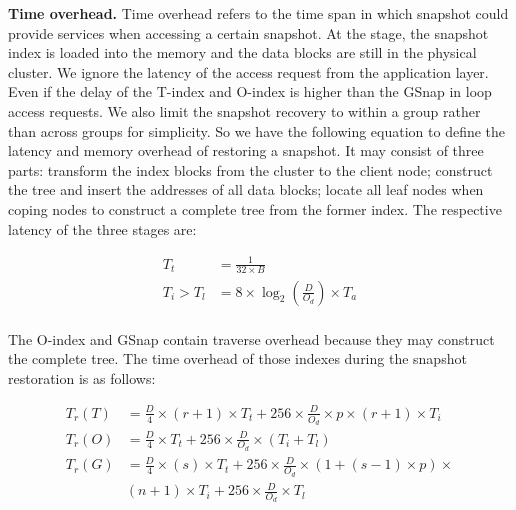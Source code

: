 \documentclass[sigconf, nonacm]{acmart}
\begin{document}
\textbf{Time overhead.} Time overhead refers to the time span in which snapshot could provide services when accessing a certain snapshot. At the stage, the snapshot index is loaded into the memory and the data blocks are still in the physical cluster. We ignore the latency of the access request from the application layer. Even if the delay of the T-index and O-index is higher than the GSnap in loop access requests. We also limit the snapshot recovery to within a group rather than across groups for simplicity. So we have the following equation to define the latency and memory overhead of restoring a snapshot. It may consist of three parts: transform the index blocks from the cluster to the client node; construct the tree and insert  the addresses of all data blocks; locate all leaf nodes when coping nodes to construct a complete tree from the former index. The respective latency of the three stages are:

\begin{small}
	\begin{equation}
		\begin{split}
			T_t&=\frac{1}{32 \times B} \\
			T_i > T_l&= 8\times \log_2(\frac{D}{O_d})\times T_a \\
		\end{split}
	\end{equation}
\end{small}
\vspace{-0.2cm}

The O-index and GSnap contain traverse overhead because they may construct the complete tree. The time overhead of those indexes during the snapshot restoration is as follows:

\vspace{-0.2cm}
\begin{small}
	\begin{equation}
		\begin{split}
			T_r(T) &= \frac{D}{4}\times(r+1)\times T_t+ 256\times \frac{D}{O_d} \times p \times(r+1) \times T_i\\
			T_r(O) &= \frac{D}{4}\times T_t+ 256\times \frac{D}{O_d} \times (T_i + T_l)\\
			T_r(G) &= \frac{D}{4}\times(s)\times T_t+ 256\times \frac{D}{O_d} \times (1+(s -1)\times p) \times \\
			&	(n+1)\times T_i+ 256\times \frac{D}{O_d} \times T_l
		\end{split}
	\end{equation}
\end{small}
\vspace{-0.2cm}
\end{document}
